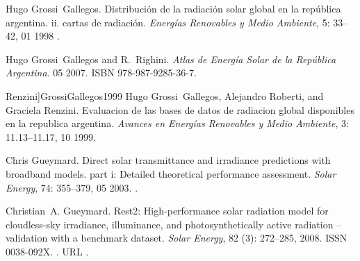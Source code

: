 \documentclass[letterpaper,12pt, twoside]{report}
\providecommand{\DIFdeltex}[1]{{\protect\color{red} \scriptsize #1}} %
\providecommand{\DIFdel}[1]{\texorpdfstring{\DIFdeltex{#1}}{}} %
\begin{document}
\DIFdel{Hugo Grossi~Gallegos.
}%
\DIFdel{Distribución de la radiación solar global en la república
  argentina. ii. cartas de radiación.
}%
\DIFdel{\emph{Energías Renovables y Medio Ambiente}, 5:}%
\DIFdel{33--42, 01
  1998}%
\DIFdel{.
}%

\DIFdel{Hugo Grossi~Gallegos and R.~Righini.
}%
\DIFdel{\emph{Atlas de Energía Solar de la República Argentina}.
}%
\DIFdel{05 2007.
}%
\DIFdel{ISBN 978-987-9285-36-7.
}%

  Renzini]{GrossiGallegos1999}
\DIFdel{Hugo Grossi~Gallegos, Alejandro Roberti, and Graciela Renzini.
}%
\DIFdel{Evaluacion de las bases de datos de radiacion global disponibles en
  la republica argentina.
}%
\DIFdel{\emph{Avances en Energías Renovables y Medio Ambiente}, 3:}%
\DIFdel{11.13--11.17, 10 1999.
}%

\DIFdel{Chris Gueymard.
}%
\DIFdel{Direct solar transmittance and irradiance predictions with broadband
  models. part i: Detailed theoretical performance assessment.
}%
\DIFdel{\emph{Solar Energy}, 74:}%
\DIFdel{355--379, 05 2003.
}%
\DIFdel{.
}%

\DIFdel{Christian~A. Gueymard.
}%
\DIFdel{Rest2: High-performance solar radiation model for cloudless-sky
  irradiance, illuminance, and photosynthetically active radiation –
  validation with a benchmark dataset.
}%
\DIFdel{\emph{Solar Energy}, 82}%
\DIFdel{(3):}%
\DIFdel{272--285, 2008.
}%
\DIFdel{ISSN 0038-092X.
}%
\DIFdel{.
}%
\DIFdel{URL
  }%
\DIFdel{.
}%
\end{document}

